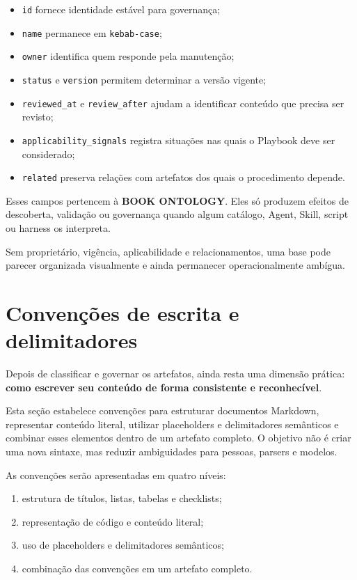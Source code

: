 \documentclass[
  10pt,
  a4paper,
  oneside]{book}
\providecommand{\tightlist}{%
  \setlength{\itemsep}{0pt}\setlength{\parskip}{0pt}}
\begin{document}
\begin{itemize}
\tightlist
\item
  \texttt{id} fornece identidade estável para governança;
\item
  \texttt{name} permanece em \texttt{kebab-case};
\item
  \texttt{owner} identifica quem responde pela manutenção;
\item
  \texttt{status} e \texttt{version} permitem determinar a versão
  vigente;
\item
  \texttt{reviewed\_at} e \texttt{review\_after} ajudam a identificar
  conteúdo que precisa ser revisto;
\item
  \texttt{applicability\_signals} registra situações nas quais o
  Playbook deve ser considerado;
\item
  \texttt{related} preserva relações com artefatos dos quais o
  procedimento depende.
\end{itemize}

Esses campos pertencem à \textbf{BOOK ONTOLOGY}. Eles só produzem
efeitos de descoberta, validação ou governança quando algum catálogo,
Agent, Skill, script ou harness os interpreta.

Sem proprietário, vigência, aplicabilidade e relacionamentos, uma base
pode parecer organizada visualmente e ainda permanecer operacionalmente
ambígua.

\hypertarget{convenuxe7uxf5es-de-escrita-e-delimitadores}{%
\section{Convenções de escrita e
delimitadores}\label{convenuxe7uxf5es-de-escrita-e-delimitadores}}

Depois de classificar e governar os artefatos, ainda resta uma dimensão
prática: \textbf{como escrever seu conteúdo de forma consistente e
reconhecível}.

Esta seção estabelece convenções para estruturar documentos Markdown,
representar conteúdo literal, utilizar placeholders e delimitadores
semânticos e combinar esses elementos dentro de um artefato completo. O
objetivo não é criar uma nova sintaxe, mas reduzir ambiguidades para
pessoas, parsers e modelos.

As convenções serão apresentadas em quatro níveis:

\begin{enumerate}
\def\labelenumi{\arabic{enumi}.}
\tightlist
\item
  estrutura de títulos, listas, tabelas e checklists;
\item
  representação de código e conteúdo literal;
\item
  uso de placeholders e delimitadores semânticos;
\item
  combinação das convenções em um artefato completo.
\end{enumerate}
\end{document}
